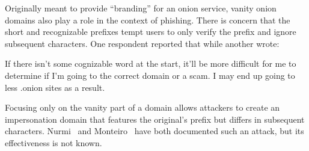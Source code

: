 Originally meant to provide ``branding'' for an onion service, vanity onion
domains also play a role in the context of phishing.  There is concern that the
short and recognizable prefixes tempt users to only verify the prefix and ignore
subsequent characters.  One respondent reported that  while another wrote:

\begin{displayquote}
If there isn't some cognizable word at the start, it'll be more difficult for me
to determine if I'm going to the correct domain or a scam. I may end up going to
less .onion sites as a result.
\end{displayquote}

Focusing only on the vanity part of a domain allows attackers to create an
impersonation domain that features the original's prefix but differs in
subsequent characters.  Nurmi~\cite{Nurmi2015a} and
Monteiro~\cite{Monteiro2016a} have both documented such an attack, but its
effectiveness is not known.
